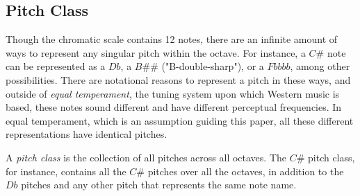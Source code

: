 \subsection{Pitch Class}

Though the chromatic scale contains 12 notes, there are an infinite amount of ways to represent any singular pitch within the octave. For instance, a $C\#$ note can be represented as a $Db$, a $B\#\#$ ("B-double-sharp"), or a $Fbbbb$, among other possibilities. There are notational reasons to represent a pitch in these ways, and outside of \textit{equal temperament}, the tuning system upon which Western music is based, these notes sound different and have different perceptual frequencies. In equal temperament, which is an assumption guiding this paper, all these different representations have identical pitches.

A \textit{pitch class} is the collection of all pitches across all octaves. The $C\#$ pitch class, for instance, contains all the $C\#$ pitches over all the octaves, in addition to the $Db$ pitches and any other pitch that represents the same note name.
